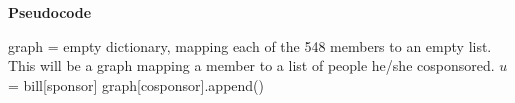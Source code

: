 \documentclass[11pt]{article}
\begin{document}



\textbf{Pseudocode}\\
\begin{algorithmic}[1]
\State graph = empty dictionary, mapping each of the 548 members to an empty list.   This will be a graph mapping a member to a list of people he/she cosponsored. 
	\State $u$ = bill[sponsor]
		\State graph[cosponsor].append()
	\EndFor 


\EndFor







\EndProcedure
\end{algorithmic}
\end{document}
